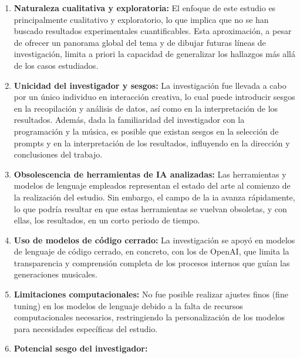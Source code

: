 \begin{enumerate}
\item \textbf{Naturaleza cualitativa y exploratoria:} El enfoque de este estudio es principalmente cualitativo y exploratorio, lo que implica que no se han buscado resultados experimentales cuantificables. Esta aproximación, a pesar de ofrecer un panorama global del tema y de dibujar futuras líneas de investigación, limita a priori la capacidad de generalizar los hallazgos más allá de los casos estudiados.

\item \textbf{Unicidad del investigador y sesgos:} La investigación fue llevada a cabo por un único individuo en interacción creativa, lo cual puede introducir sesgos en la recopilación y análisis de datos, así como en la interpretación de los resultados. Además, dada la familiaridad del investigador con la programación y la música, es posible que existan sesgos en la selección de prompts y en la interpretación de los resultados, influyendo en la dirección y conclusiones del trabajo.

\item \textbf{Obsolescencia de herramientas de \gls{IA} analizadas:} Las herramientas y modelos de lenguaje empleados representan el estado del arte al comienzo de la realización del estudio. Sin embargo, el campo de la \gls{ia} avanza rápidamente, lo que podría resultar en que estas herramientas se vuelvan obsoletas, y con ellas, los resultados, en un corto periodo de tiempo.

\item \textbf{Uso de modelos de código cerrado:} La investigación se apoyó en modelos de lenguaje de código cerrado, en concreto, con los de OpenAI, que limita la transparencia y comprensión completa de los procesos internos que guían las generaciones musicales.

\item \textbf{Limitaciones computacionales:} No fue posible realizar ajustes finos (fine tuning) en los modelos de lenguaje debido a la falta de recursos computacionales necesarios, restringiendo la personalización de los modelos para necesidades específicas del estudio.

\item \textbf{Potencial sesgo del investigador:} 

\end{enumerate}


